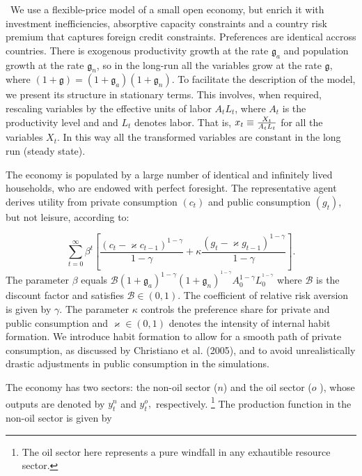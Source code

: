 \documentclass[11pt]{article}
\begin{document}
\quad\ We use a flexible-price model of a small open economy, but enrich it
with investment inefficiencies, absorptive capacity constraints and a
country risk premium that captures foreign credit constraints. Preferences
are identical accross countries. There is exogenous productivity growth at
the rate $\mathfrak{g}_{a}$ and population growth at the rate $\mathfrak{g}%
_{n}$, so in the long-run all the variables grow at the rate $\mathfrak{g}$,
where $(1+\mathfrak{g})=(1+\mathfrak{g}_{a})(1+\mathfrak{g}_{n})$. To
facilitate the description of the model, we present its structure in
stationary terms. This involves, when required, rescaling variables by the
effective units of labor $A_{t}L_{t}$, where $A_{t}$ is the productivity
level and and $L_{t}$ denotes labor. That is, $x_{t}\equiv \frac{X_{t}}{%
A_{t}L_{t}}$ for all the variables $X_{t}$. In this way all the transformed
variables are constant in the long run (steady state).

The economy is populated by a large number of identical and infinitely lived
households, who are endowed with perfect foresight. The representative agent
derives utility from private consumption $(c_{t})$ and public consumption $%
(g_{t})$, but not leisure, according to:

\begin{equation}
\sum_{t=0}^{\infty }\beta ^{t}\left[ \frac{\left( c_{t}-\varkappa
c_{t-1}\right) ^{1-\gamma }}{1-\gamma }+\kappa \frac{\left( g_{t}-\varkappa
g_{t-1}\right) ^{1-\gamma }}{1-\gamma }\right] .  \label{1}
\end{equation}%
The parameter $\beta $ equals $\mathcal{B}(1+\mathfrak{g}_{a})^{1-\gamma }(1+%
\mathfrak{g}_{n})^{^{1-\gamma }}A_{0}^{1-\gamma }L_{0}^{^{1-\gamma }}$ where 
$\mathcal{B}$ is the discount factor and satisfies $\mathcal{B}\in (0,1)$.
The coefficient of relative risk aversion is given by $\gamma $. The
parameter $\kappa $ controls the preference share for private and public
consumption and $\varkappa \in (0,1)$ denotes the intensity of internal
habit formation. We introduce habit formation to allow for a smooth path of
private consumption, as discussed by Christiano et al. (2005), and to avoid
unrealistically drastic adjustments in public consumption in the simulations.

The economy has two sectors: the non-oil sector ($n$) and the oil sector ($o$%
), whose outputs are denoted by $y_{t}^{n}$ and $y_{t}^{o},$ respectively.%
\footnote{%
The oil sector here represents a pure windfall in any exhautible resource
sector.} The production function in the non-oil sector is given by
\end{document}

